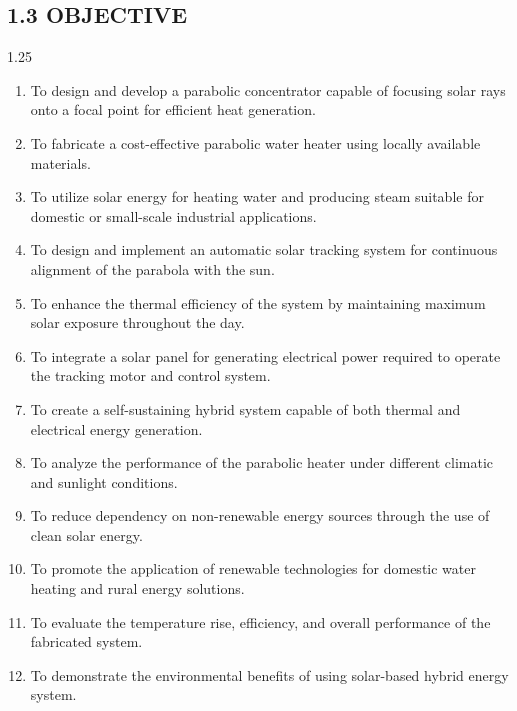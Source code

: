 \documentclass[12pt,a4paper]{article}
\begin{document}



\subsection*{1.3 OBJECTIVE}
\vspace{3mm}

\begin{spacing}{1.25}
{\fontsize{10.5}{14.5}\selectfont
\begin{enumerate}[leftmargin=8mm, itemsep=2.5mm]
  \item To design and develop a parabolic concentrator capable of focusing solar rays onto a focal point for efficient heat generation.
  \item To fabricate a cost-effective parabolic water heater using locally available materials.
  \item To utilize solar energy for heating water and producing steam suitable for domestic or small-scale industrial applications.
  \item To design and implement an automatic solar tracking system for continuous alignment of the parabola with the sun.
  \item To enhance the thermal efficiency of the system by maintaining maximum solar exposure throughout the day.
  \item To integrate a solar panel for generating electrical power required to operate the tracking motor and control system.
  \item To create a self-sustaining hybrid system capable of both thermal and electrical energy generation.
  \item To analyze the performance of the parabolic heater under different climatic and sunlight conditions.
  \item To reduce dependency on non-renewable energy sources through the use of clean solar energy.
  \item To promote the application of renewable technologies for domestic water heating and rural energy solutions.
  \item To evaluate the temperature rise, efficiency, and overall performance of the fabricated system.
  \item To demonstrate the environmental benefits of using solar-based hybrid energy system.
\end{enumerate}
}
\end{spacing}
\clearpage
\end{document}
